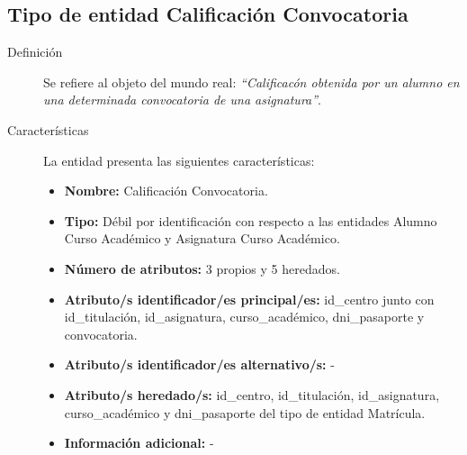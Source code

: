 \subsection{Tipo de entidad Calificación Convocatoria}

   \begin{description}

   \item[Definición] Se refiere al objeto del mundo real: \emph{``Calificacón
   obtenida por un alumno en una determinada convocatoria de una asignatura''}.

   \item[Características] La entidad presenta las siguientes características:
      \begin{itemize}
         \item \textbf{Nombre:} Calificación Convocatoria.
         \item \textbf{Tipo:} Débil por identificación con respecto a las
         entidades Alumno Curso Académico y Asignatura Curso Académico.
         \item \textbf{Número de atributos:} 3 propios y 5 heredados.
         \item \textbf{Atributo/s identificador/es principal/es:} id\_centro
         junto con \newline id\_titulación, id\_asignatura, curso\_académico,
         dni\_pasaporte y convocatoria.
         \item \textbf{Atributo/s identificador/es alternativo/s:} -
         \item \textbf{Atributo/s heredado/s:} id\_centro, id\_titulación,
         id\_asignatura, \newline curso\_académico y dni\_pasaporte del tipo de
         entidad Matrícula.
         \item \textbf{Información adicional:} -
      \end{itemize}


\end{description}
